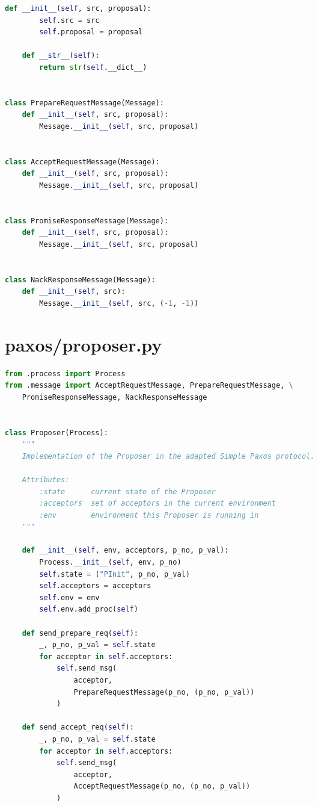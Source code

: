 \begin{landscape}
\begin{multicols*}{2}
\begin{lstlisting}[style=SourceCodeListing,language=Python]
    def __init__(self, src, proposal):
        self.src = src
        self.proposal = proposal

    def __str__(self):
        return str(self.__dict__)


class PrepareRequestMessage(Message):
    def __init__(self, src, proposal):
        Message.__init__(self, src, proposal)


class AcceptRequestMessage(Message):
    def __init__(self, src, proposal):
        Message.__init__(self, src, proposal)


class PromiseResponseMessage(Message):
    def __init__(self, src, proposal):
        Message.__init__(self, src, proposal)


class NackResponseMessage(Message):
    def __init__(self, src):
        Message.__init__(self, src, (-1, -1))
\end{lstlisting}
\end{multicols*}

\newpage


\section{paxos/proposer.py}
\begin{multicols*}{2}
\begin{lstlisting}[style=SourceCodeListing,language=Python]
from .process import Process
from .message import AcceptRequestMessage, PrepareRequestMessage, \
    PromiseResponseMessage, NackResponseMessage


class Proposer(Process):
    """
    Implementation of the Proposer in the adapted Simple Paxos protocol.

    Attributes:
        :state      current state of the Proposer
        :acceptors  set of acceptors in the current environment
        :env        environment this Proposer is running in
    """

    def __init__(self, env, acceptors, p_no, p_val):
        Process.__init__(self, env, p_no)
        self.state = ("PInit", p_no, p_val)
        self.acceptors = acceptors
        self.env = env
        self.env.add_proc(self)

    def send_prepare_req(self):
        _, p_no, p_val = self.state
        for acceptor in self.acceptors:
            self.send_msg(
                acceptor,
                PrepareRequestMessage(p_no, (p_no, p_val))
            )

    def send_accept_req(self):
        _, p_no, p_val = self.state
        for acceptor in self.acceptors:
            self.send_msg(
                acceptor,
                AcceptRequestMessage(p_no, (p_no, p_val))
            )


\end{lstlisting}
\end{multicols*}
\end{landscape}
